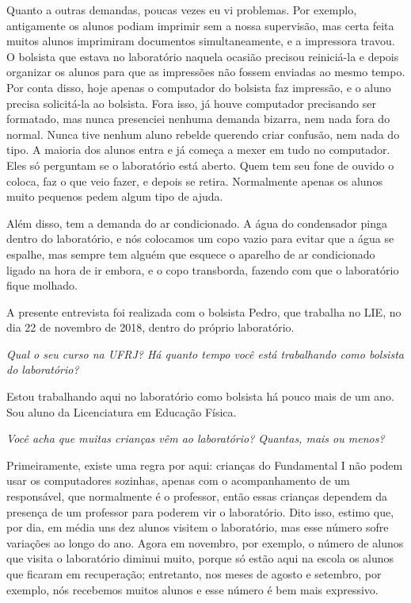 Quanto a outras demandas, poucas vezes eu vi problemas. Por exemplo, antigamente os alunos podiam imprimir sem a nossa supervisão, mas certa feita muitos alunos imprimiram documentos simultaneamente, e a impressora travou. O bolsista que estava no laboratório naquela ocasião precisou reiniciá-la e depois organizar os alunos para que as impressões não fossem enviadas ao mesmo tempo. Por conta disso, hoje apenas o computador do bolsista faz impressão, e o aluno precisa solicitá-la ao bolsista. Fora isso, já houve computador precisando ser formatado, mas nunca presenciei nenhuma demanda bizarra, nem nada fora do normal. Nunca tive nenhum aluno rebelde querendo criar confusão, nem nada do tipo. A maioria dos alunos entra e já começa a mexer em tudo no computador. Eles só perguntam se o laboratório está aberto. Quem tem seu fone de ouvido o coloca, faz o que veio fazer, e depois se retira. Normalmente apenas os alunos muito pequenos pedem algum tipo de ajuda.

Além disso, tem a demanda do ar condicionado. A água do condensador pinga dentro do laboratório, e nós colocamos um copo vazio para evitar que a água se espalhe, mas sempre tem alguém que esquece o aparelho de ar condicionado ligado na hora de ir embora, e o copo transborda, fazendo com que o laboratório fique molhado.

\label{anx:LABEL_ANX_E}

A presente entrevista foi realizada com o bolsista Pedro, que trabalha no LIE, no dia 22 de novembro de 2018, dentro do próprio laboratório.

\textit{Qual o seu curso na UFRJ? Há quanto tempo você está trabalhando como bolsista do laboratório?}

Estou trabalhando aqui no laboratório como bolsista há pouco mais de um ano. Sou aluno da Licenciatura em Educação Física.

\textit{Você acha que muitas crianças vêm ao laboratório? Quantas, mais ou menos?}

Primeiramente, existe uma regra por aqui: crianças do Fundamental I não podem usar os computadores sozinhas, apenas com o acompanhamento de um responsável, que normalmente é o professor, então essas crianças dependem da presença de um professor para poderem vir o laboratório. Dito isso, estimo que, por dia, em média uns dez alunos visitem o laboratório, mas esse número sofre variações ao longo do ano. Agora em novembro, por exemplo, o número de alunos que visita o laboratório diminui muito, porque só estão aqui na escola os alunos que ficaram em recuperação; entretanto, nos meses de agosto e setembro, por exemplo, nós recebemos muitos alunos e esse número é bem mais expressivo.

